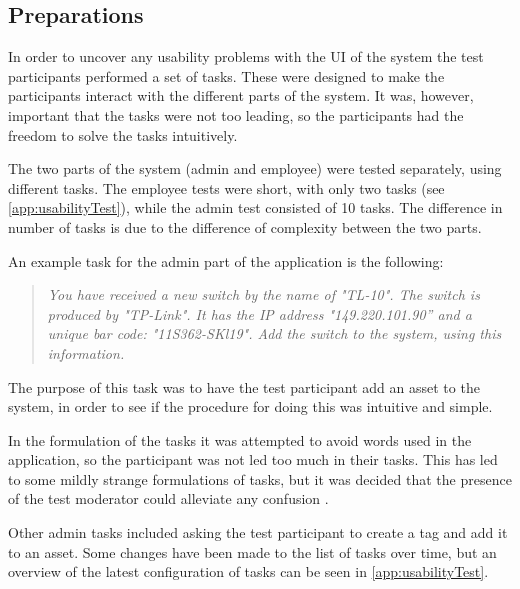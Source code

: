 \subsection{Preparations}
In order to uncover any usability problems with the UI of the system the test participants performed a set of tasks. These were designed to make the participants interact with the different parts of the system. It was, however, important that the tasks were not too leading, so the participants had the freedom to solve the tasks intuitively. 
\par
The two parts of the system (admin and employee) were tested separately, using different tasks. The employee tests were short, with only two tasks (see \autoref{app:usabilityTest}), while the admin test consisted of 10 tasks. The difference in number of tasks is due to the difference of complexity between the two parts. 
\par
An example task for the admin part of the application is the following:

\begin{quote}
\textit{You have received a new switch by the name of "TL-10". The switch is produced by "TP-Link". It has the IP address "149.220.101.90” and a unique bar code: "11S362-SKl19". Add the switch to the system, using this information.}
\end{quote}

The purpose of this task was to have the test participant add an asset to the system, in order to see if the procedure for doing this was intuitive and simple. 
\par 
In the formulation of the tasks it was attempted to avoid words used in the application, so the participant was not led too much in their tasks. This has led to some mildly strange formulations of tasks, but it was decided that the presence of the test moderator could alleviate any confusion .
\par
Other admin tasks included asking the test participant to create a tag and add it to an asset. Some changes have been made to the list of tasks over time, but an overview of the latest configuration of tasks can be seen in \autoref{app:usabilityTest}. 
\par


